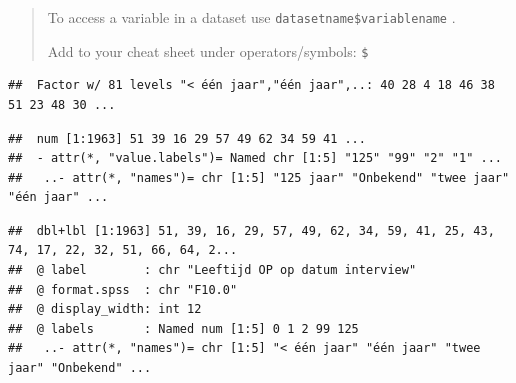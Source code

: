 \documentclass[
]{book}
\newenvironment{Shaded}{\begin{snugshade}}{\end{snugshade}}
\newcommand{\CommentTok}[1]{\textcolor[rgb]{0.56,0.35,0.01}{\textit{#1}}}
\newcommand{\KeywordTok}[1]{\textcolor[rgb]{0.13,0.29,0.53}{\textbf{#1}}}
\newcommand{\NormalTok}[1]{#1}
\newcommand{\OperatorTok}[1]{\textcolor[rgb]{0.81,0.36,0.00}{\textbf{#1}}}
\begin{document}
\begin{quote}
To access a variable in a dataset use \texttt{datasetname\$variablename} .

Add to your cheat sheet under operators/symbols: \texttt{\$}
\end{quote}

\begin{Shaded}
\end{Shaded}

\begin{verbatim}
##  Factor w/ 81 levels "< één jaar","één jaar",..: 40 28 4 18 46 38 51 23 48 30 ...
\end{verbatim}

\begin{Shaded}
\end{Shaded}

\begin{verbatim}
##  num [1:1963] 51 39 16 29 57 49 62 34 59 41 ...
##  - attr(*, "value.labels")= Named chr [1:5] "125" "99" "2" "1" ...
##   ..- attr(*, "names")= chr [1:5] "125 jaar" "Onbekend" "twee jaar" "één jaar" ...
\end{verbatim}

\begin{Shaded}
\end{Shaded}

\begin{verbatim}
##  dbl+lbl [1:1963] 51, 39, 16, 29, 57, 49, 62, 34, 59, 41, 25, 43, 74, 17, 22, 32, 51, 66, 64, 2...
##  @ label        : chr "Leeftijd OP op datum interview"
##  @ format.spss  : chr "F10.0"
##  @ display_width: int 12
##  @ labels       : Named num [1:5] 0 1 2 99 125
##   ..- attr(*, "names")= chr [1:5] "< één jaar" "één jaar" "twee jaar" "Onbekend" ...
\end{verbatim}
\end{document}

